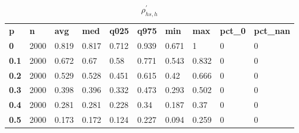 \begin{table}[h]
 \centering 
\footnotesize
\caption{$\rho_{hs,h}^\prime $}
\label{tab:alphahsh}
\begin{tabular}[h]{| l l l l l l l l l l|
    } \hline
\textbf{ p} & \textbf{ n} & \textbf{ avg} & \textbf{ med} & \textbf{ q025} & \textbf{ q975} & \textbf{ min} & \textbf{ max} & \textbf{ pct\_0} & \textbf{ pct\_nan}
           \\
  \textbf{  0} & 2000 & 0.819 & 0.817 & 0.712 & 0.939 & 0.671 &     1 & 0 & 0
           \\
  \textbf{0.1} & 2000 & 0.672 &  0.67 &  0.58 & 0.771 & 0.543 & 0.832 & 0 & 0
           \\
  \textbf{0.2} & 2000 & 0.529 & 0.528 & 0.451 & 0.615 &  0.42 & 0.666 & 0 & 0
           \\
  \textbf{0.3} & 2000 & 0.398 & 0.396 & 0.332 & 0.473 & 0.293 & 0.502 & 0 & 0
           \\
  \textbf{0.4} & 2000 & 0.281 & 0.281 & 0.228 &  0.34 & 0.187 &  0.37 & 0 & 0
           \\
  \textbf{0.5} & 2000 & 0.173 & 0.172 & 0.124 & 0.227 & 0.094 & 0.259 & 0 & 0
           \\
 \hline \end{tabular}
 \end{table}
